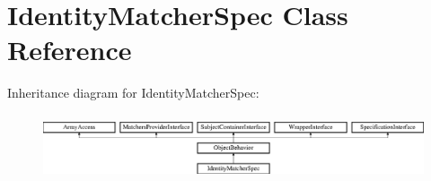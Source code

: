 \section{Identity\+Matcher\+Spec Class Reference}
\label{classspec_1_1_php_spec_1_1_matcher_1_1_identity_matcher_spec}
Inheritance diagram for Identity\+Matcher\+Spec\+:\begin{figure}[H]
\begin{center}
\leavevmode
\includegraphics[height=1.953488cm]{classspec_1_1_php_spec_1_1_matcher_1_1_identity_matcher_spec}
\end{center}
\end{figure}

